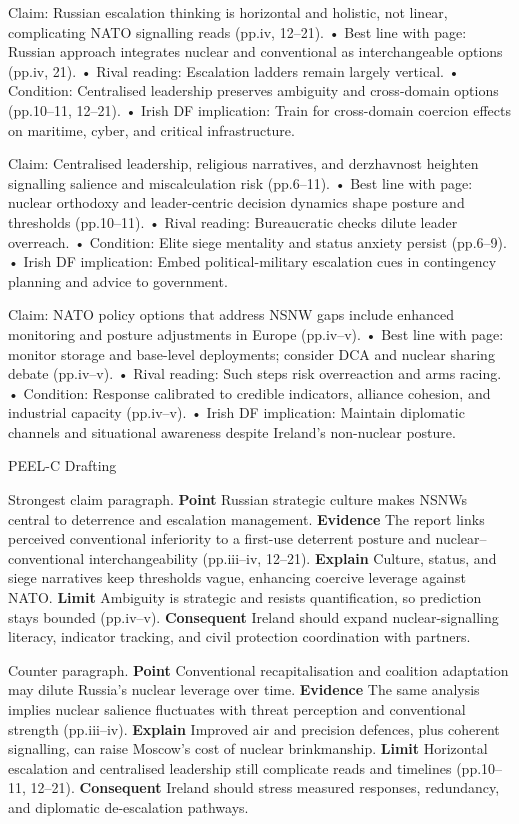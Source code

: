 Claim: Russian escalation thinking is horizontal and holistic, not linear, complicating NATO signalling reads (pp.iv, 12–21).
• Best line with page: Russian approach integrates nuclear and conventional as interchangeable options (pp.iv, 21).
• Rival reading: Escalation ladders remain largely vertical.
• Condition: Centralised leadership preserves ambiguity and cross-domain options (pp.10–11, 12–21).
• Irish DF implication: Train for cross-domain coercion effects on maritime, cyber, and critical infrastructure.

Claim: Centralised leadership, religious narratives, and derzhavnost heighten signalling salience and miscalculation risk (pp.6–11).
• Best line with page: nuclear orthodoxy and leader-centric decision dynamics shape posture and thresholds (pp.10–11).
• Rival reading: Bureaucratic checks dilute leader overreach.
• Condition: Elite siege mentality and status anxiety persist (pp.6–9).
• Irish DF implication: Embed political-military escalation cues in contingency planning and advice to government.

Claim: NATO policy options that address NSNW gaps include enhanced monitoring and posture adjustments in Europe (pp.iv–v).
• Best line with page: monitor storage and base-level deployments; consider DCA and nuclear sharing debate (pp.iv–v).
• Rival reading: Such steps risk overreaction and arms racing.
• Condition: Response calibrated to credible indicators, alliance cohesion, and industrial capacity (pp.iv–v).
• Irish DF implication: Maintain diplomatic channels and situational awareness despite Ireland’s non-nuclear posture.

PEEL-C Drafting

Strongest claim paragraph.
\textbf{Point} Russian strategic culture makes NSNWs central to deterrence and escalation management.
\textbf{Evidence} The report links perceived conventional inferiority to a first-use deterrent posture and nuclear–conventional interchangeability (pp.iii–iv, 12–21).
\textbf{Explain} Culture, status, and siege narratives keep thresholds vague, enhancing coercive leverage against NATO.
\textbf{Limit} Ambiguity is strategic and resists quantification, so prediction stays bounded (pp.iv–v). \textbf{Consequent} Ireland should expand nuclear-signalling literacy, indicator tracking, and civil protection coordination with partners.

Counter paragraph.
\textbf{Point} Conventional recapitalisation and coalition adaptation may dilute Russia’s nuclear leverage over time.
\textbf{Evidence} The same analysis implies nuclear salience fluctuates with threat perception and conventional strength (pp.iii–iv).
\textbf{Explain} Improved air and precision defences, plus coherent signalling, can raise Moscow’s cost of nuclear brinkmanship.
\textbf{Limit} Horizontal escalation and centralised leadership still complicate reads and timelines (pp.10–11, 12–21). \textbf{Consequent} Ireland should stress measured responses, redundancy, and diplomatic de-escalation pathways.

